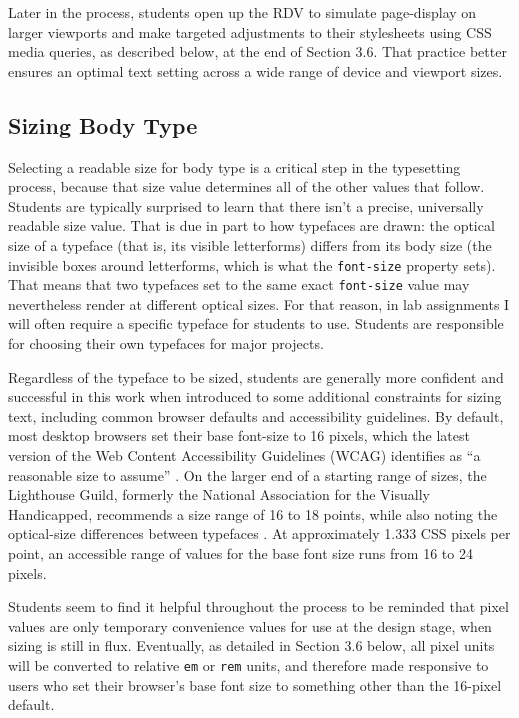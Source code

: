 \documentclass[sigplan,screen]{acmart}
\begin{document}
Later in the process, students open up the RDV to simulate page-display on larger viewports and make targeted adjustments to their stylesheets using CSS media queries, as described below, at the end of Section 3.6. That practice better ensures an optimal text setting across a wide range of device and viewport sizes.

\subsection{Sizing Body Type}

Selecting a readable size for body type is a critical step in the typesetting process, because that size value determines all of the other values that follow. Students are typically surprised to learn that there isn’t a precise, universally readable size value. That is due in part to how typefaces are drawn: the optical size of a typeface (that is, its visible letterforms) differs from its body size (the invisible boxes around letterforms, which is what the \verb|font-size| property sets). That means that two typefaces set to the same exact \verb|font-size| value may nevertheless render at different optical sizes. For that reason, in lab assignments I will often require a specific typeface for students to use. Students are responsible for choosing their own typefaces for major projects.

Regardless of the typeface to be sized, students are generally more confident and successful in this work when introduced to some additional constraints for sizing text, including common browser defaults and accessibility guidelines. By default, most desktop browsers set their base font-size to 16 pixels, which the latest version of the Web Content Accessibility Guidelines (WCAG) identifies as “a reasonable size to assume” \cite{w3c:wcag}. On the larger end of a starting range of sizes, the Lighthouse Guild, formerly the National Association for the Visually Handicapped, recommends a size range of 16 to 18 points, while also noting the optical-size differences between typefaces \cite{lhg:mtl}. At approximately 1.333 CSS pixels per point, an accessible range of values for the base font size runs from 16 to 24 pixels.

Students seem to find it helpful throughout the process to be reminded that pixel values are only temporary convenience values for use at the design stage, when sizing is still in flux. Eventually, as detailed in Section 3.6 below, all pixel units will be converted to relative \verb|em| or \verb|rem| units, and therefore made responsive to users who set their browser's base font size to something other than the 16-pixel default.
\end{document}
